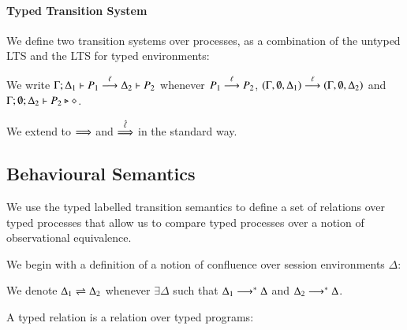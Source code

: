 \paragraph{Typed Transition System}

We define two transition systems over processes, as a combination
of the untyped LTS and the LTS for typed environments:

\begin{definition}\label{d:tlts}\rm
	We write
%
	$\Gamma; \Delta_1 \vdash P_1 \stackrel{\ell}{\longrightarrow} \Delta_2 \vdash P_2$
	whenever
	$P_1 \stackrel{\ell}{\longrightarrow} P_2$,
	$(\Gamma, \emptyset, \Delta_1) \stackrel{\ell}{\longrightarrow} (\Gamma, \emptyset, \Delta_2)$
	and $\Gamma; \emptyset; \Delta_2 \vdash P_2 \triangleright \diamond$.

%
\end{definition}

We extend to $\stackrel{}{\Longrightarrow}$ and $\stackrel{\hat{\ell}}{\Longrightarrow}$ in the standard way.



\subsection{Behavioural Semantics}

We use the typed labelled transition semantics to define
a set of relations over typed processes that allow us to compare
typed processes over a notion of observational equivalence.

We begin with a definition of a notion of confluence
over session environments $\Delta$:
%
\begin{definition}\rm
	We denote $\Delta_1 \rightleftharpoons \Delta_2$ whenever $\exists \Delta$ such that
	$\Delta_1 \longrightarrow^* \Delta$ and $\Delta_2 \longrightarrow^* \Delta$.
\end{definition}
%
A typed relation is a relation over typed programs:

